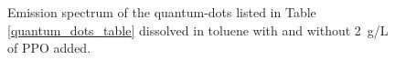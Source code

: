 \documentclass{JINST}
\begin{document}
\begin{figure}[tbh]
\begin{center}
\caption[]{Emission spectrum of the quantum-dots listed in Table \ref{quantum_dots_table} dissolved in toluene with and without 2~g/L of PPO added.\label{emi_spec}}
\end{center}
\end{figure}
\end{document}
